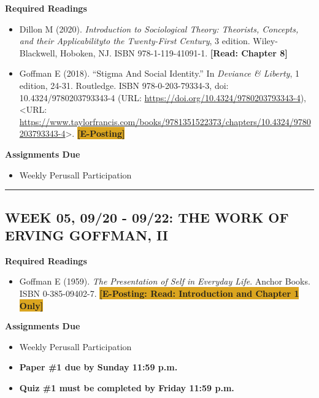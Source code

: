 \documentclass[11pt,]{article}
\providecommand{\tightlist}{%
  \setlength{\itemsep}{0pt}\setlength{\parskip}{0pt}}
\begin{document}
\textbf{Required Readings}

\begin{itemize}
\item
  Dillon M (2020). \emph{Introduction to Sociological Theory: Theorists,
  Concepts, and their Applicabilityto the Twenty-First Century}, 3
  edition. Wiley-Blackwell, Hoboken, NJ. ISBN 978-1-119-41091-1.
  \textcolor{BrickRed}{\bf{[Read: Chapter 8]}}
\item
  Goffman E (2018). ``Stigma And Social Identity.'' In \emph{Deviance \&
  Liberty}, 1 edition, 24-31. Routledge. ISBN 978-0-203-79334-3, doi:
  10.4324/9780203793343-4 (URL:
  \url{https://doi.org/10.4324/9780203793343-4}), \textless URL:
  \url{https://www.taylorfrancis.com/books/9781351522373/chapters/10.4324/9780203793343-4}\textgreater.
  \colorbox{Goldenrod}{\bf{[E-Posting]}}
\end{itemize}

\textbf{Assignments Due}

\begin{itemize}
\tightlist
\item
  Weekly Perusall Participation
\end{itemize}

\bigbreak
\hrule

\hypertarget{week-05-0920---0922-the-work-of-erving-goffman-ii}{%
\subsection{WEEK 05, 09/20 - 09/22: THE WORK OF ERVING GOFFMAN,
II}\label{week-05-0920---0922-the-work-of-erving-goffman-ii}}

\textbf{Required Readings}

\begin{itemize}
\tightlist
\item
  Goffman E (1959). \emph{The Presentation of Self in Everyday Life}.
  Anchor Books. ISBN 0-385-09402-7.
  \colorbox{Goldenrod}{\bf{[E-Posting: Read: Introduction and Chapter 1 Only]}}
\end{itemize}

\textbf{Assignments Due}

\begin{itemize}
\tightlist
\item
  Weekly Perusall Participation
\item
  \textbf{Paper \#1 due by Sunday 11:59 p.m.}
\item
  \textbf{Quiz \#1 must be completed by Friday 11:59 p.m.}
\end{itemize}
\end{document}
